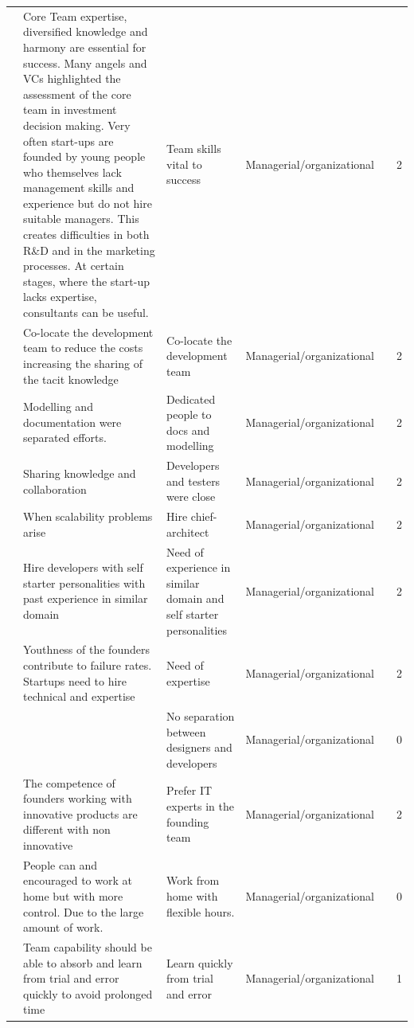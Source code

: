 \documentclass[final,5p,times,twocolumn]{elsarticle}
\begin{document}
\begin{center}
\begin{longtable}{|p{0.36in}|p{2.6in}|p{1.2in}|p{0.9in}|p{0.9in}|p{0.2in}|}
\cite{Chorev2006} & Core Team expertise, diversified knowledge and harmony are essential for success. Many angels and VCs highlighted the assessment of the core team in investment decision making. Very often start-ups are founded by young people who themselves lack management skills and experience but do not hire suitable managers. This creates difficulties in both R\&D and in the marketing processes. At certain stages, where the start-up lacks expertise, consultants can be useful. & Team skills vital to success & Managerial/organizational &       & 2 \\
\cite{Coleman2007} & Co-locate the development team to reduce the costs increasing the sharing of the tacit knowledge & Co-locate the development team & Managerial/organizational &       & 2 \\
\cite{Ambler2002} & Modelling and documentation were separated efforts. & Dedicated people to docs and modelling & Managerial/organizational &       & 2 \\
\cite{Ambler2002} & Sharing knowledge and collaboration & Developers and testers were close & Managerial/organizational &       & 2 \\
\cite{Ambler2002} & When scalability problems arise & Hire chief-architect & Managerial/organizational &       & 2 \\
\cite{Yoffie1999} & Hire developers with self starter personalities with past experience in similar domain & Need of experience in similar domain and self starter personalities & Managerial/organizational &       & 2 \\
\cite{Yoffie1999} & Youthness of the founders contribute to failure rates. Startups need to hire technical and expertise & Need of expertise & Managerial/organizational &       & 2 \\
\cite{Tanabian2005} &       & No separation between designers and developers & Managerial/organizational &       & 0 \\
\cite{Hasel2010} & The competence of founders working with innovative products are different with non innovative & Prefer IT experts in the founding team & Managerial/organizational &       & 2 \\
\cite{Tanabian2005} & People can and encouraged to work at home but with more control. Due to the large amount of work. & Work from home with flexible hours. & Managerial/organizational &       & 0 \\
\cite{Midler2008} & Team capability should be able to absorb and learn from trial and error quickly to avoid prolonged time & Learn quickly from trial and error & Managerial/organizational &       & 1 \\

\end{longtable}
\end{center}
\end{document}
